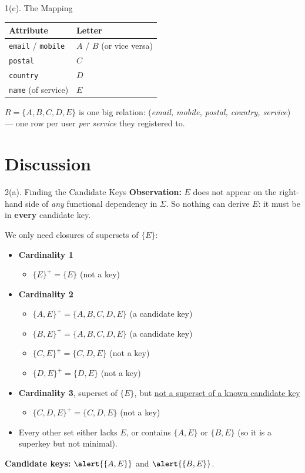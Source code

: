 \documentclass{beamer}
\newcommand\cl[1]{\{#1\}^+}
\begin{document}
\begin{frame}{1(c). The Mapping}
\begin{center}
\renewcommand{\arraystretch}{1.3}
\begin{tabular}{ll}
\toprule
\textbf{Attribute} & \textbf{Letter} \\
\midrule
\texttt{email} / \texttt{mobile} & $A$ / $B$ (or vice versa) \\
\texttt{postal} & $C$ \\
\texttt{country} & $D$ \\
\texttt{name} (of service) & $E$ \\
\bottomrule
\end{tabular}
\end{center}
\medskip
\small
$R = \{A,B,C,D,E\}$ is one big relation: (\emph{email, mobile, postal, country, service}) --- one row per user \emph{per service} they registered to.
\end{frame}

\section{Discussion}

\begin{frame}{2(a). Finding the Candidate Keys}
\footnotesize
\textbf{Observation:} $E$ does not appear on the right-hand side of \emph{any} functional dependency in $\Sigma$. So nothing can derive $E$: it must be in \textbf{every} candidate key.
\medskip

We only need closures of supersets of $\{E\}$:
\begin{itemize}\itemsep1pt
  \pause
  \item \textbf{Cardinality 1}
  \begin{itemize}
    \item $\cl{E} = \{E\}$ \hfill (not a key)
  \end{itemize}
  \pause
  \item \textbf{Cardinality 2}
  \begin{itemize}
    \item $\cl{A,E} = \{A,B,C,D,E\}$ \hfill \alert{(a candidate key)}
    \item $\cl{B,E} = \{A,B,C,D,E\}$ \hfill \alert{(a candidate key)}
    \item $\cl{C,E} = \{C,D,E\}$ \hfill (not a key)
    \item $\cl{D,E} = \{D,E\}$ \hfill (not a key)
  \end{itemize}
  \pause
  \item \textbf{Cardinality 3}, superset of $\{E\}$, but \underline{not a superset of a known candidate key}
  \begin{itemize}
    \item $\cl{C,D,E} = \{C,D,E\}$ \hfill (not a key)
  \end{itemize}
  \pause
  \item Every other set either lacks $E$, or contains $\{A,E\}$ or $\{B,E\}$ (so it is a superkey but not minimal).
\end{itemize}
\pause
\textbf{Candidate keys:} $\alert{\{A,E\}}$ and $\alert{\{B,E\}}$.
\end{frame}
\end{document}
